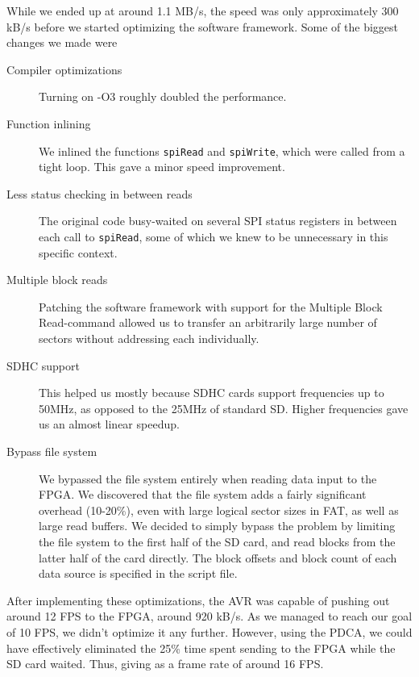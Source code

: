 While we ended up at around 1.1 MB/s, the speed was only approximately 300 kB/s
before we started optimizing the software framework. Some of the biggest changes
we made were
\begin{description}
\item[Compiler optimizations] Turning on -O3 roughly doubled
  the performance.
\item[Function inlining] We inlined the functions {\tt spiRead} and
  {\tt spiWrite}, which were called from a tight loop. This gave a minor speed
  improvement.
\item[Less status checking in between reads] The original code busy-waited on
  several \ac{SPI} status registers in between each call to {\tt spiRead}, some
  of which we knew to be unnecessary in this specific context.
\item[Multiple block reads] Patching the software framework with support for the
  Multiple Block Read-command allowed us to transfer an arbitrarily large number
  of sectors without addressing each individually.
\item[SDHC support] This helped us mostly because \ac{SDHC} cards support
  frequencies up to 50MHz, as opposed to the 25MHz of standard \ac{SD}. Higher
  frequencies gave us an almost linear speedup.
\item[Bypass file system] We bypassed the file system entirely when reading data
  input to the \ac{FPGA}. We discovered that the file system adds a fairly
  significant overhead (10-20\%), even with large logical sector sizes in
  \ac{FAT}, as well as large read buffers. We decided to simply bypass the
  problem by limiting the file system to the first half of the \ac{SD} card, and
  read blocks from the latter half of the card directly. The block offsets and
  block count of each data source is specified in the script file.
\end{description}

After implementing these optimizations, the AVR was capable of pushing out around
12 FPS to the \ac{FPGA}, around 920 kB/s. As we managed to reach our goal of 10
FPS, we didn't optimize it any further. However, using the \ac{PDCA}, we could
have effectively eliminated the 25\% time spent sending to the \ac{FPGA} while
the \ac{SD} card waited. Thus, giving as a frame rate of around 16
FPS. 


